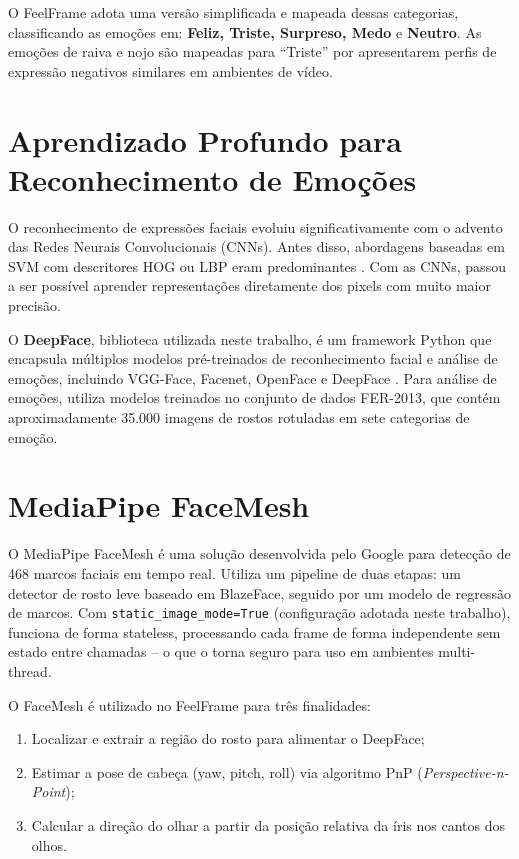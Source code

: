 \documentclass[
	12pt,
	openright,
	oneside,
	a4paper,
	english,
	brazil
	]{abntex2}
\begin{document}
O FeelFrame adota uma versão simplificada e mapeada dessas categorias, classificando as emoções em: \textbf{Feliz, Triste, Surpreso, Medo} e \textbf{Neutro}. As emoções de raiva e nojo são mapeadas para ``Triste'' por apresentarem perfis de expressão negativos similares em ambientes de vídeo.

\section{Aprendizado Profundo para Reconhecimento de Emoções}

O reconhecimento de expressões faciais evoluiu significativamente com o advento das Redes Neurais Convolucionais (CNNs). Antes disso, abordagens baseadas em SVM com descritores HOG ou LBP eram predominantes \cite{dalal2005histograms}. Com as CNNs, passou a ser possível aprender representações diretamente dos pixels com muito maior precisão.

O \textbf{DeepFace}, biblioteca utilizada neste trabalho, é um framework Python que encapsula múltiplos modelos pré-treinados de reconhecimento facial e análise de emoções, incluindo VGG-Face, Facenet, OpenFace e DeepFace \cite{serengil2020lightface}. Para análise de emoções, utiliza modelos treinados no conjunto de dados FER-2013, que contém aproximadamente 35.000 imagens de rostos rotuladas em sete categorias de emoção.

\section{MediaPipe FaceMesh}

O MediaPipe FaceMesh \cite{lugaresi2019mediapipe} é uma solução desenvolvida pelo Google para detecção de 468 marcos faciais em tempo real. Utiliza um pipeline de duas etapas: um detector de rosto leve baseado em BlazeFace, seguido por um modelo de regressão de marcos. Com \texttt{static\_image\_mode=True} (configuração adotada neste trabalho), funciona de forma stateless, processando cada frame de forma independente sem estado entre chamadas -- o que o torna seguro para uso em ambientes multi-thread.

O FaceMesh é utilizado no FeelFrame para três finalidades:
\begin{enumerate}
    \item Localizar e extrair a região do rosto para alimentar o DeepFace;
    \item Estimar a pose de cabeça (yaw, pitch, roll) via algoritmo PnP (\textit{Perspective-n-Point});
    \item Calcular a direção do olhar a partir da posição relativa da íris nos cantos dos olhos.
\end{enumerate}
\end{document}
